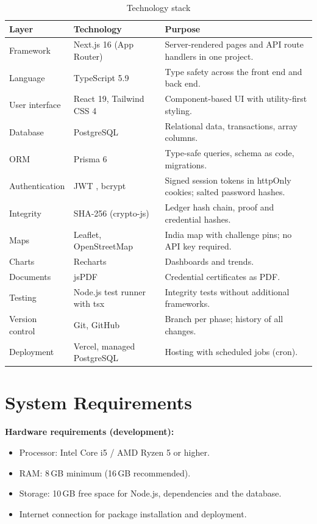 \begin{table}[H]
\centering
\caption{Technology stack}
\label{tab:stack}
\small
\begin{tabularx}{\textwidth}{@{}L{3.3cm}L{3.6cm}X@{}}
\toprule
\textbf{Layer} & \textbf{Technology} & \textbf{Purpose} \\
\midrule
Framework & Next.js 16 (App Router) \cite{nextjs} & Server-rendered pages and API route handlers in one project. \\
Language & TypeScript 5.9 & Type safety across the front end and back end. \\
User interface & React 19, Tailwind CSS 4 & Component-based UI with utility-first styling. \\
Database & PostgreSQL & Relational data, transactions, array columns. \\
ORM & Prisma 6 \cite{prisma} & Type-safe queries, schema as code, migrations. \\
Authentication & JWT \cite{rfc7519}, bcrypt \cite{provos1999} & Signed session tokens in httpOnly cookies; salted password hashes. \\
Integrity & SHA-256 (crypto-js) \cite{fips180} & Ledger hash chain, proof and credential hashes. \\
Maps & Leaflet, OpenStreetMap & India map with challenge pins; no API key required. \\
Charts & Recharts & Dashboards and trends. \\
Documents & jsPDF & Credential certificates as PDF. \\
Testing & Node.js test runner with tsx & Integrity tests without additional frameworks. \\
Version control & Git, GitHub & Branch per phase; history of all changes. \\
Deployment & Vercel, managed PostgreSQL & Hosting with scheduled jobs (cron). \\
\bottomrule
\end{tabularx}
\end{table}

\section{System Requirements}

\textbf{Hardware requirements (development):}
\begin{itemize}
  \item Processor: Intel Core i5 / AMD Ryzen 5 or higher.
  \item RAM: 8\,GB minimum (16\,GB recommended).
  \item Storage: 10\,GB free space for Node.js, dependencies and the database.
  \item Internet connection for package installation and deployment.
\end{itemize}

